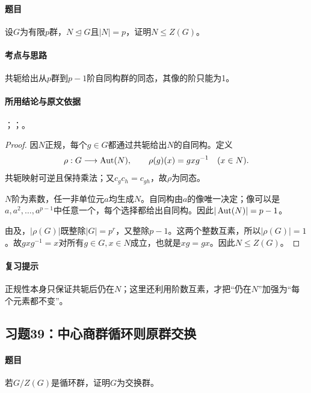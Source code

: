 \paragraph{题目}
设$G$为有限$p$群，$N\trianglelefteq G$且$|N|=p$，证明$N\le Z(G)$。

\paragraph{考点与思路}
共轭给出从$p$群到$p-1$阶自同构群的同态，其像的阶只能为1。

\paragraph{所用结论与原文依据}
；；。


\begin{proof}
因$N$正规，每个$g\in G$都通过共轭给出$N$的自同构。定义
\[
\rho:G\longrightarrow\operatorname{Aut}(N),\qquad
\rho(g)(x)=gxg^{-1}\quad(x\in N).
\]
共轭映射可逆且保持乘法；又$c_gc_h=c_{gh}$，故$\rho$为同态。

$N$阶为素数，任一非单位元$a$均生成$N$。自同构由$a$的像唯一决定；像可以是$a,a^2,\ldots,a^{p-1}$中任意一个，每个选择都给出自同构。因此$|\operatorname{Aut}(N)|=p-1$。

由及，$|\rho(G)|$既整除$|G|=p^r$，又整除$p-1$。这两个整数互素，所以$|\rho(G)|=1$。故$gxg^{-1}=x$对所有$g\in G,x\in N$成立，也就是$xg=gx$。因此$N\le Z(G)$。
\end{proof}

\paragraph{复习提示}
正规性本身只保证共轭后仍在$N$；这里还利用阶数互素，才把“仍在$N$”加强为“每个元素都不变”。


\subsection{习题39：\texorpdfstring{中心商群循环则原群交换}{中心商群循环则原群交换}}
\label{ex:2:39}

\paragraph{题目}
若$G/Z(G)$是循环群，证明$G$为交换群。

